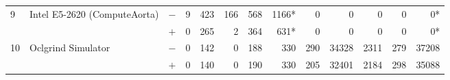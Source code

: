 \begin{tabular}{lll | rrrrr | rrrrr }
\hline
\multirow{ 2}{*}{9} & \multirow{ 2}{*}{Intel E5-2620 (ComputeAorta)} & $-$ & 9 & 423 & 166 & 568 & 1166*       & 0 & 0 & 0 & 0 & 0* \\& & $+$ & 0 & 265 & 2 & 364 & 631* & 0 & 0 & 0 & 0 & 0* \\
\hline
\multirow{ 2}{*}{10} & \multirow{ 2}{*}{Oclgrind Simulator} & $-$ & 0 & 142 & 0 & 188 & 330       & 290 & 34328 & 2311 & 279 & 37208 \\& & $+$ & 0 & 140 & 0 & 190 & 330 & 205 & 32401 & 2184 & 298 & 35088 \\
  \bottomrule
\end{tabular}

